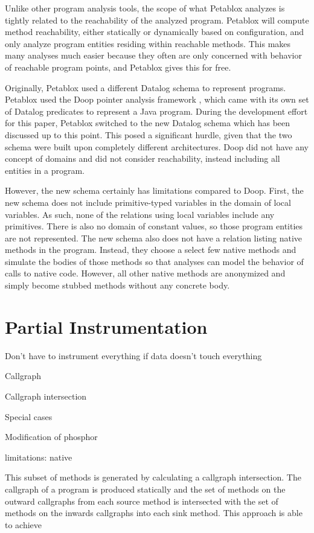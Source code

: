 Unlike other program analysis tools, the scope of what Petablox analyzes is tightly related to the reachability of the analyzed program. Petablox will compute method reachability, either statically or dynamically based on configuration, and only analyze program entities residing within reachable methods. This makes many analyses much easier because they often are only concerned with behavior of reachable program points, and Petablox gives this for free.

Originally, Petablox used a different Datalog schema to represent programs. Petablox used the Doop pointer analysis framework \cite{doop}, which came with its own set of Datalog predicates to represent a Java program. During the development effort for this paper, Petablox switched to the new Datalog schema which has been discussed up to this point. This posed a significant hurdle, given that the two schema were built upon completely different architectures. Doop did not have any concept of domains and did not consider reachability, instead including all entities in a program.  

However, the new schema certainly has limitations compared to Doop. First, the new schema does not include primitive-typed variables in the domain of local variables. As such, none of the relations using local variables include any primitives. There is also no domain of constant values, so those program entities are not represented. The new schema also does not have a relation listing native methods in the program. Instead, they choose a select few native methods and simulate the bodies of those methods so that analyses can model the behavior of calls to native code. However, all other native methods are anonymized and simply become stubbed methods without any concrete body.
\section{Partial Instrumentation}
Don't have to instrument everything if data doesn't touch everything

Callgraph

Callgraph intersection

Special cases

Modification of phosphor

limitations: native

This subset of methods is generated by calculating a callgraph intersection. The callgraph of a program is produced statically and the set of methods on the outward callgraphs from each source method is intersected with the set of methods on the inwards callgraphs into each sink method. This approach is able to achieve 


